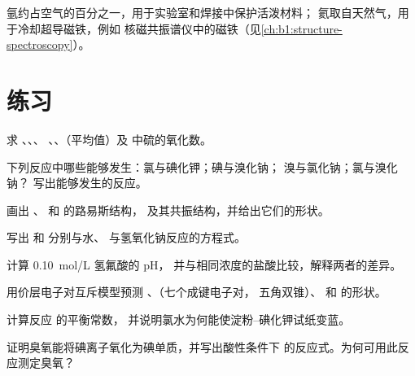 氩约占空气的百分之一，用于实验室和焊接中保护活泼材料；
氦取自天然气，用于冷却超导磁铁，例如
核磁共振谱仪中的磁铁（见\cref{ch:b1:structure-spectroscopy}）。

\section{练习}

\begin{exercise}[$\star$]\label{exo:b1:p-block-16-18:1}
求 、、、
、、（平均值）及  中硫的氧化数。
\end{exercise}

\begin{exercise}[$\star$]\label{exo:b1:p-block-16-18:2}
下列反应中哪些能够发生：氯与碘化钾；碘与溴化钠；
溴与氯化钠；氯与溴化钠？
写出能够发生的反应。
\end{exercise}

\begin{exercise}[$\star$]\label{exo:b1:p-block-16-18:3}
画出 、 和  的路易斯结构，
及其共振结构，并给出它们的形状。
\end{exercise}

\begin{exercise}[$\star$]\label{exo:b1:p-block-16-18:4}
写出  和  分别与水、
与氢氧化钠反应的方程式。
\end{exercise}

\begin{exercise}[$\star\star$]\label{exo:b1:p-block-16-18:5}
计算 \qty{0.10}{mol/L} 氢氟酸的 pH，
并与相同浓度的盐酸比较，解释两者的差异。
\end{exercise}

\begin{exercise}[$\star\star$]\label{exo:b1:p-block-16-18:6}
用价层电子对互斥模型预测 、（七个成键电子对，
五角双锥）、 和  的形状。
\end{exercise}

\begin{exercise}[$\star\star$]\label{exo:b1:p-block-16-18:7}
计算反应  的平衡常数，
并说明氯水为何能使淀粉–碘化钾试纸变蓝。
\end{exercise}

\begin{exercise}[$\star\star$]\label{exo:b1:p-block-16-18:8}
证明臭氧能将碘离子氧化为碘单质，并写出酸性条件下
的反应式。为何可用此反应测定臭氧？
\end{exercise}

